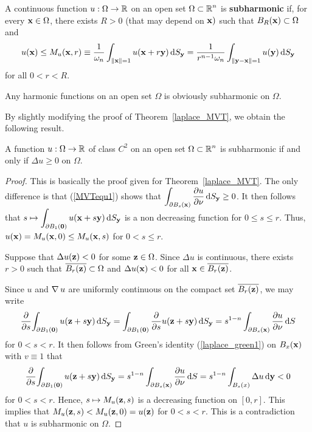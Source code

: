 \begin{defn}
A continuous function $u:\Omega \to \RR$ on an open set
$\displaystyle \Omega \subset \RR^n$ is
{\bfseries subharmonic}
if, for every $\VEC{x} \in \Omega$, there exists $R>0$ (that may depend
on $\VEC{x})$ such that $B_R(\VEC{x}) \subset \Omega$ and
\[
u(\VEC{x}) \leq M_u(\VEC{x},r) \equiv \frac{1}{\omega_n}
\int_{\|\VEC{x}\|=1} u(\VEC{x} + r\VEC{y}) \dss{S}{y}
= \frac{1}{r^{n-1}\omega_n} \int_{\|\VEC{y}-\VEC{x}\|=1} u(\VEC{y}) \dss{S}{y}
\]
for all $0<r<R$.
\end{defn}

Any harmonic functions on an open set $\Omega$ is obviously
subharmonic on $\Omega$.

By slightly modifying the proof of Theorem~\ref{laplace_MVT}, we
obtain the following result.

\begin{prop}
A function $u:\Omega \to \RR$ of class $\displaystyle C^2$ on an open set
$\displaystyle \Omega \subset \RR^n$ is subharmonic if and only if
$\Delta u \geq 0$ on $\Omega$.
\end{prop}

\begin{proof}
\stage{$\mathbf{\Leftarrow}$}  This is basically the proof given for
Theorem~\ref{laplace_MVT}.  The only difference is that
(\ref{MVTequ1}) shows that $\displaystyle \int_{\partial B_s(\VEC{x})}
\pdydx{u}{\VEC{\nu}} \dss{S}{y} \geq 0$.
It then follows that
$\displaystyle s \mapsto
\int_{\partial B_1(\VEC{0})} u(\VEC{x} + s\VEC{y}) \dss{S}{y}$
is a non decreasing function for $0 \leq s \leq r$.  Thus,
$u(\VEC{x}) = M_u(\VEC{x},0) \leq M_u(\VEC{x},s)$ for $0 < s \leq r$.

\stage{$\mathbf{\Rightarrow}$}
Suppose that $\Delta u(\VEC{z}) < 0$ for some $\VEC{z} \in \Omega$.
Since $\Delta u$ is continuous, there exists $r>0$ such that
$\displaystyle \overline{B_r(\VEC{z})} \subset \Omega$ and
$\Delta u(\VEC{x}) < 0 $ for all
$\displaystyle \VEC{x} \in \overline{B_r(\VEC{z})}$.

Since $u$ and $\graD u$ are uniformly continuous on the compact set
$\displaystyle \overline{B_r(\VEC{z})}$, we may write
\[
\pdfdx{ \int_{\partial B_1(\VEC{0})} u(\VEC{z} + s\VEC{y}) \dss{S}{y} }{s}
= \int_{\partial B_1(\VEC{0})} \pdfdx{ u(\VEC{z} + s\VEC{y})}{s} \dss{S}{y}
= s^{1-n} \int_{\partial B_s(\VEC{x})} \pdydx{u}{\VEC{\nu}} \dx{S}
\]
for $0 < s < r$.
It then follows from Green's identity (\ref{laplace_green1}) on
$B_x(\VEC{x})$ with $v \equiv 1$ that
\[
\pdfdx{ \int_{\partial B_1(\VEC{0})} u(\VEC{z} + s\VEC{y}) \dss{S}{y} }{s}
= s^{1-n} \int_{\partial B_s(\VEC{x})} \pdydx{u}{\VEC{\nu}} \dx{S}
= s^{1-n} \int_{B_s{\VEC(x)}} \Delta u \dx{\VEC{y}} < 0
\]
for $0 < s < r$.  Hence, $s \mapsto M_u(\VEC{z},s)$ is a decreasing
function on $[0,r]$.  This implies that
$M_u(\VEC{z},s) < M_u(\VEC{z},0) = u(\VEC{z})$
for $0<s<r$.  This is a contradiction that $u$ is subharmonic on $\Omega$.
\end{proof}

